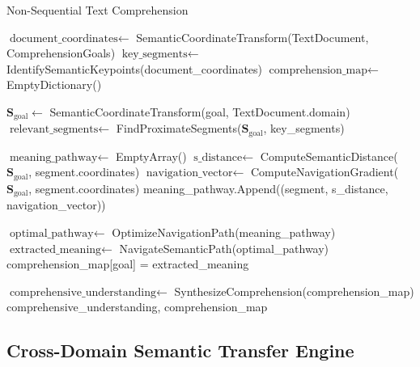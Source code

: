 \documentclass[12pt,a4paper]{article}
\begin{document}
\begin{algorithm}[H]
\caption{Non-Sequential Text Comprehension}
\label{alg:non_sequential_comprehension}
\begin{algorithmic}[1]
    \State $\text{document\_coordinates} \gets$ SemanticCoordinateTransform(TextDocument, ComprehensionGoals)
    \State $\text{key\_segments} \gets$ IdentifySemanticKeypoints(document\_coordinates)
    \State $\text{comprehension\_map} \gets$ EmptyDictionary()
    
        \State $\mathbf{S}_{\text{goal}} \gets$ SemanticCoordinateTransform(goal, TextDocument.domain)
        \State $\text{relevant\_segments} \gets$ FindProximateSegments($\mathbf{S}_{\text{goal}}$, key\_segments)
        
        \State $\text{meaning\_pathway} \gets$ EmptyArray()
            \State $\text{s\_distance} \gets$ ComputeSemanticDistance($\mathbf{S}_{\text{goal}}$, segment.coordinates)
            \State $\text{navigation\_vector} \gets$ ComputeNavigationGradient($\mathbf{S}_{\text{goal}}$, segment.coordinates)
            \State meaning\_pathway.Append((segment, s\_distance, navigation\_vector))
        \EndFor
        
        \State $\text{optimal\_pathway} \gets$ OptimizeNavigationPath(meaning\_pathway)
        \State $\text{extracted\_meaning} \gets$ NavigateSemanticPath(optimal\_pathway)
        \State comprehension\_map[goal] = extracted\_meaning
    \EndFor
    
    \State $\text{comprehensive\_understanding} \gets$ SynthesizeComprehension(comprehension\_map)
    \State \Return comprehensive\_understanding, comprehension\_map
\EndProcedure
\end{algorithmic}
\end{algorithm}

\subsection{Cross-Domain Semantic Transfer Engine}
\end{document}

